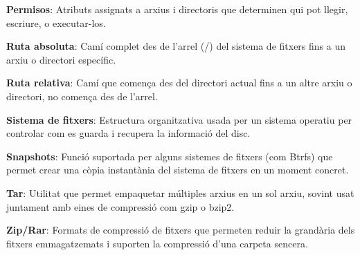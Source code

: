 \documentclass[
  12 pt,
  a4paper,
]{article}
\begin{document}
\textbf{Permisos}: Atributs assignats a arxius i directoris que
determinen qui pot llegir, escriure, o executar-los.

\textbf{Ruta absoluta}: Camí complet des de l'arrel (/) del sistema de
fitxers fins a un arxiu o directori específic.

\textbf{Ruta relativa}: Camí que comença des del directori actual fins a
un altre arxiu o directori, no comença des de l'arrel.

\textbf{Sistema de fitxers}: Estructura organitzativa usada per un
sistema operatiu per controlar com es guarda i recupera la informació
del disc.

\textbf{Snapshots}: Funció suportada per alguns sistemes de fitxers (com
Btrfs) que permet crear una còpia instantània del sistema de fitxers en
un moment concret.

\textbf{Tar}: Utilitat que permet empaquetar múltiples arxius en un sol
arxiu, sovint usat juntament amb eines de compressió com gzip o bzip2.

\textbf{Zip/Rar}: Formats de compressió de fitxers que permeten reduir
la grandària dels fitxers emmagatzemats i suporten la compressió d'una
carpeta sencera.
\end{document}
